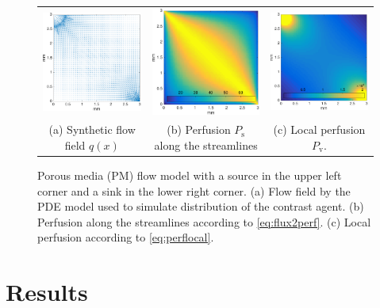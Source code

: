 \documentclass[journal,twocolumn]{IEEEtran}
\newcommand{\Perfv}{P_{\mathrm{v}}}
\newcommand{\Perfs}{P_{\mathrm{s}}}
\begin{document}
\begin{figure}[h!tb]
	\centering
	\begin{tabular}{c c c}
		\includegraphics[width=.3\textwidth]{figs/qmat.pdf} & \includegraphics[width=.3\textwidth]{figs/perfmat.pdf} & \includegraphics[width=.3\textwidth]{figs/lperfmat.pdf}\\
		(a) Synthetic flow field $q(x)$ & (b) Perfusion $\Perfs$ along the streamlines  & (c) Local perfusion $\Perfv$.
	\end{tabular}
	\caption{Porous media (PM) flow model with a source in the upper left corner and a sink in the lower right corner. (a) Flow field by the PDE model used to simulate distribution of the contrast agent. (b) Perfusion along the streamlines according to \eqref{eq:flux2perf}. (c) Local perfusion according to \eqref{eq:perflocal}.}
        \label{fig:flowpressureperfusion}
\end{figure}


	\section{Results}	
\end{document}
